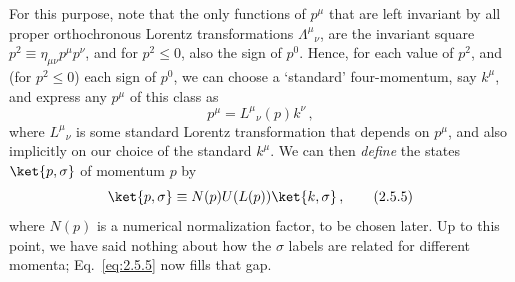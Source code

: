 For this purpose, note that the only functions of $p^\mu$ that are left
invariant by all proper orthochronous Lorentz transformations
$\Lambda^\mu{}_{\nu}$, are the invariant square
$p^2\equiv\eta_{\mu\nu}p^\mu p^\nu$, and for $p^2\leq0$, also the sign of
$p^0$. Hence, for each value of $p^2$, and (for $p^2\leq0$) each sign of
$p^0$, we can choose a `standard' four-momentum, say $k^\mu$, and express any
$p^\mu$ of this class as
\begin{equation}
p^\mu=L^\mu{}_{\nu}(p)k^\nu\,,
\tag{2.5.4}\label{eq:2.5.4}
\end{equation}
where $L^\mu{}_{\nu}$ is some standard Lorentz transformation that depends on
$p^\mu$, and also implicitly on our choice of the standard $k^\mu$. We can
then \emph{define} the states $\ket{p,\sigma}$ of momentum $p$ by
\begin{equation}
\ket{p,\sigma}\equiv N(p)U(L(p))\ket{k,\sigma}\,,
\tag{2.5.5}\label{eq:2.5.5}
\end{equation}
where $N(p)$ is a numerical normalization factor, to be chosen later. Up to
this point, we have said nothing about how the $\sigma$ labels are related for
different momenta; Eq.~\eqref{eq:2.5.5} now fills that gap.

